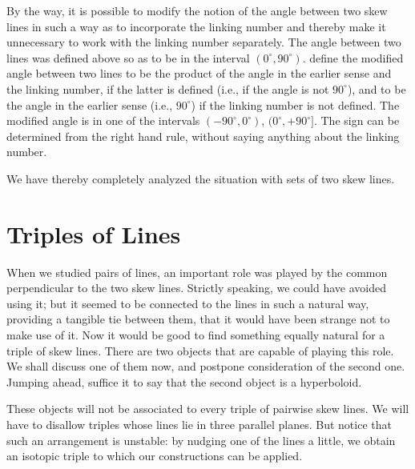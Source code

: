 \documentclass{article}
\begin{document}
By the way, it is possible to modify the notion of the angle between two skew
lines in such a way as to incorporate the linking number and thereby make
it unnecessary to work with the linking number separately. The angle
between two lines was defined above so as to be in the interval
$(0^\circ,90^\circ)$.
 define the modified angle between two lines to be the
product of the angle in the earlier sense and the linking number, if the
latter is defined (i.e., if the angle is not $90^\circ$), and to be the angle
in the earlier sense (i.e., $90^\circ$) if the linking number is not
defined. The modified angle is in one of the intervals $(-90^\circ,0^\circ)$,
$(0^\circ,+90^\circ]$. The sign can be determined from the right hand rule,
without saying anything about the linking number.

We have thereby completely analyzed the situation with sets of two skew lines.

\section{Triples of Lines}

When we studied pairs of lines, an important role was played by the common
perpendicular to the two skew lines. Strictly speaking, we could have avoided
using it; but it seemed to be connected to the lines in such a natural way,
providing a tangible tie between them, that it would have been strange not to
make use of it. Now it would be good to find something equally natural for a
triple of skew lines. There are two objects that are capable of playing this
role. We shall discuss one of them now, and postpone consideration of the
second one. Jumping ahead, suffice it to say that the second object is a
hyperboloid.

These objects will not be associated to every triple of pairwise skew lines. We
will have to disallow triples whose lines lie in three parallel planes. But
notice that such an arrangement is unstable: by nudging one of the lines a
little, we obtain an isotopic triple to which our constructions can be applied.
\end{document}
